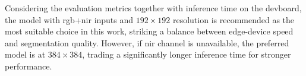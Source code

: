 {Considering the evaluation metrics together with inference time on the \gls{devboard},
the  model with \gls{rgb}+\gls{nir} inputs and \ensuremath{192\times192} resolution is recommended as the most suitable choice in this work,
striking a balance between edge-device speed and segmentation quality.
However, if \gls{nir} channel is unavailable, the preferred model is  at \ensuremath{384\times384},
trading a significantly longer inference time for stronger performance.

}